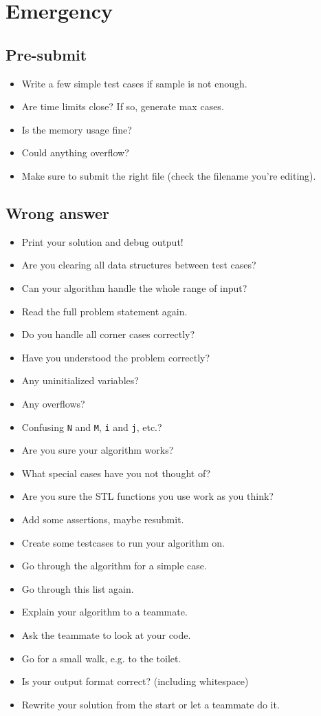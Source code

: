 \documentclass[12pt, a4paper, twoside]{article}
\begin{document}
\section{Emergency}
\subsection{Pre-submit}
\begin{itemize}
  \item Write a few simple test cases if sample is not enough.
  \item Are time limits close? If so, generate max cases.
  \item Is the memory usage fine?
  \item Could anything overflow?
  \item Make sure to submit the right file (check the filename you're editing).
\end{itemize}
\subsection{Wrong answer}
\begin{itemize}
  \item Print your solution and debug output!
  \item Are you clearing all data structures between test cases?
  \item Can your algorithm handle the whole range of input?
  \item Read the full problem statement again.
  \item Do you handle all corner cases correctly?
  \item Have you understood the problem correctly?
  \item Any uninitialized variables?
  \item Any overflows?
  \item Confusing \texttt{N} and \texttt{M}, \texttt{i} and \texttt{j}, etc.?
  \item Are you sure your algorithm works?
  \item What special cases have you not thought of?
  \item Are you sure the STL functions you use work as you think?
  \item Add some assertions, maybe resubmit.
  \item Create some testcases to run your algorithm on.
  \item Go through the algorithm for a simple case.
  \item Go through this list again.
  \item Explain your algorithm to a teammate.
  \item Ask the teammate to look at your code.
  \item Go for a small walk, e.g. to the toilet.
  \item Is your output format correct? (including whitespace)
  \item Rewrite your solution from the start or let a teammate do it.
\end{itemize}
\end{document}
